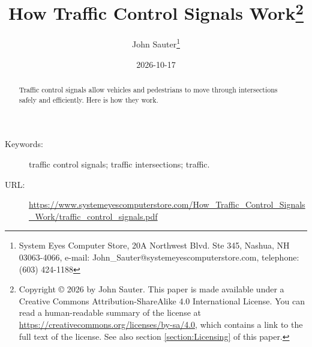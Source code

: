 \documentclass[letterpaper,twoside]{article}
\begin{document}
\title{How Traffic Control Signals Work\footnote{Copyright
    {\copyright} 2026 by John Sauter.
    This paper is made available under a
    Creative Commons Attribution-ShareAlike 4.0 International License.
    You can read a human-readable summary of the license at
    \href{https://creativecommons.org/licenses/by-sa/4.0}{https://creativecommons.org/licenses/by-sa/4.0},
    which contains a link to the full text of the license.
    See also section \ref{section:Licensing} of this paper.}
}
\author{John Sauter\footnote{
    System Eyes Computer Store,
    20A Northwest Blvd.  Ste 345,
    Nashua, NH  03063-4066,
    e-mail: John\_Sauter@systemeyescomputerstore.com,
    telephone: (603) 424-1188}}

\date{2026-10-17}
\maketitle
\begin{abstract}
  Traffic control signals allow vehicles and pedestrians to move through
  intersections safely and efficiently.  Here is how they work.
\end{abstract}
\begin{description}
\item[Keywords:]traffic control signals; traffic intersections; traffic.
\item[URL:]\href{https://www.systemeyescomputerstore.com/How\_Traffic\_Control\_Signals\_Work/traffic\_control\_signals.pdf}{https://www.systemeyescomputerstore.com/How\_Traffic\_Control\_Signals\_Work/traffic\_control\_signals.pdf}
\end{description}
\newpage
\end{document}
